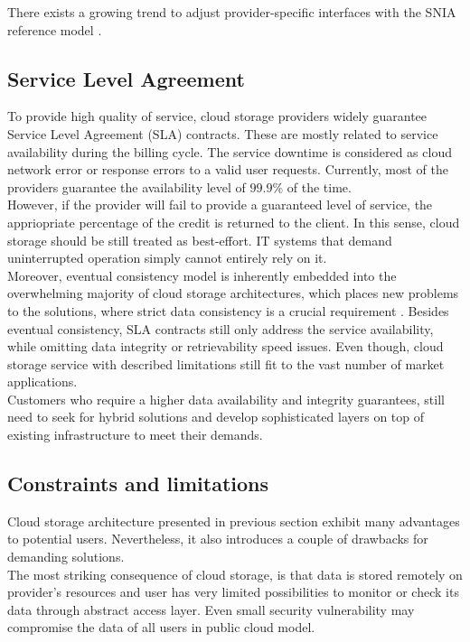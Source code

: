 There exists a growing trend to adjust provider-specific interfaces with the
SNIA reference model \cite{amazon-s3, rackspace-cloud, openstack-cloud}.
		
		\subsection{Service Level Agreement}
To provide high quality of service, cloud storage providers widely guarantee
Service Level Agreement (SLA) contracts. These are mostly related to service
availability during the billing cycle. The service downtime is considered as
cloud network error or response errors to a valid user requests. Currently,
most of the providers guarantee the availability level of $99.9\%$ of the time.\\

However, if the provider will fail to provide a guaranteed level of service,
the appriopriate percentage of the credit is returned to the client. In this
sense, cloud storage should be still treated as best-effort. IT systems that
demand uninterrupted operation simply cannot entirely rely on it.\\

Moreover, eventual consistency model is inherently embedded into the
overwhelming majority of cloud storage architectures, which places new problems
to the solutions, where strict data consistency is a crucial requirement
\cite{metastorage, cloud-federation}. Besides eventual consistency, SLA
contracts still only address the service availability, while omitting data
integrity or retrievability speed issues. Even though, cloud storage service
with described limitations still fit to the vast number of market 
applications.\\

Customers who require a higher data availability and integrity guarantees,
still need to seek for hybrid solutions and develop sophisticated layers on
top of existing infrastructure to meet their demands.

		\subsection{Constraints and limitations}
Cloud storage architecture presented in previous section exhibit many
advantages to potential users. Nevertheless, it also introduces a couple of
drawbacks for demanding solutions.\\

The most striking consequence of cloud storage, is that data is stored remotely
on provider's resources and user has very limited possibilities to monitor or
check its data through abstract access layer. Even small security vulnerability
may compromise the data of all users in public cloud model.\\

